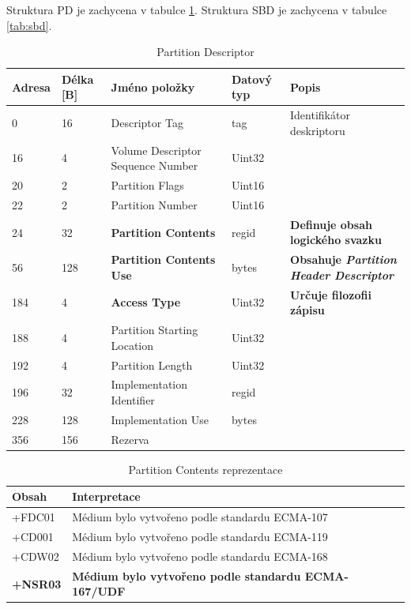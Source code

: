 Struktura PD je zachycena v tabulce \ref{tab:pd}. Struktura SBD je zachycena v tabulce \ref{tab:sbd}. 
\begin{table}[]
    \centering
    \begin{tabular}{ | l | l | p{4.2cm} | p{1.8cm} | p{5.5cm} | }
        \hline
        Adresa  & Délka [B]   & Jméno položky & Datový typ    & Popis \\ \hline\hline
        0   &16     & Descriptor Tag                    & tag           & Identifikátor deskriptoru \\ \hline
        16  &4      &Volume Descriptor Sequence Number  & Uint32        & \\ \hline
        20  &2      &Partition Flags                    & Uint16        & \\ \hline
        22  &2      &Partition Number                   & Uint16        & \\ \hline
        24  &32     &\textbf{Partition Contents}        & regid         & \textbf{Definuje obsah logického svazku} \\ \hline
        56  &128    &\textbf{Partition Contents Use}    & bytes         & \textbf{Obsahuje \textit{Partition Header Descriptor}} \\ \hline
        184 &4      &\textbf{Access Type}               & Uint32        & \textbf{Určuje filozofii zápisu} \\ \hline
        188 &4      &Partition Starting Location        & Uint32        & \\ \hline
        192 &4      &Partition Length                   & Uint32        & \\ \hline
        196 &32     &Implementation Identifier          & regid         & \\ \hline
        228 &128    &Implementation Use                 & bytes         & \\ \hline
        356 &156    &Rezerva                            &               & \\ \hline 
    \end{tabular}
    \caption{Partition Descriptor\label{tab:pd}}
\end{table}
\begin{table}
    \centering
    \begin{tabular}{| l | l |}
        \hline
        Obsah & Interpretace \\ \hline\hline
        +FDC01& Médium bylo vytvořeno podle standardu ECMA-107 \\ \hline
        +CD001& Médium bylo vytvořeno podle standardu ECMA-119\\ \hline
        +CDW02& Médium bylo vytvořeno podle standardu ECMA-168\\ \hline
        \textbf{+NSR03}& \textbf{Médium bylo vytvořeno podle standardu ECMA-167/UDF}\\ \hline
    \end{tabular}
    \caption{Partition Contents reprezentace\label{tab:pd-partition-contents}}
\end{table}
